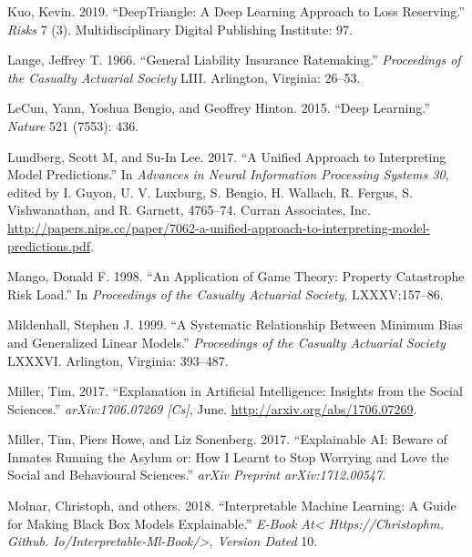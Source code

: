 \documentclass[preprint, 3p, twocolumn, letterpaper, 10pt]{elsarticle} %
\begin{document}
\leavevmode\hypertarget{ref-kuoDeepTriangleDeep2018}{}%
Kuo, Kevin. 2019. ``DeepTriangle: A Deep Learning Approach to Loss Reserving.'' \emph{Risks} 7 (3). Multidisciplinary Digital Publishing Institute: 97.

\leavevmode\hypertarget{ref-lange_1966}{}%
Lange, Jeffrey T. 1966. ``General Liability Insurance Ratemaking.'' \emph{Proceedings of the Casualty Actuarial Society} LIII. Arlington, Virginia: 26--53.

\leavevmode\hypertarget{ref-lecunDeepLearning2015}{}%
LeCun, Yann, Yoshua Bengio, and Geoffrey Hinton. 2015. ``Deep Learning.'' \emph{Nature} 521 (7553): 436.

\leavevmode\hypertarget{ref-NIPS2017_7062}{}%
Lundberg, Scott M, and Su-In Lee. 2017. ``A Unified Approach to Interpreting Model Predictions.'' In \emph{Advances in Neural Information Processing Systems 30}, edited by I. Guyon, U. V. Luxburg, S. Bengio, H. Wallach, R. Fergus, S. Vishwanathan, and R. Garnett, 4765--74. Curran Associates, Inc. \url{http://papers.nips.cc/paper/7062-a-unified-approach-to-interpreting-model-predictions.pdf}.

\leavevmode\hypertarget{ref-mango_1998}{}%
Mango, Donald F. 1998. ``An Application of Game Theory: Property Catastrophe Risk Load.'' In \emph{Proceedings of the Casualty Actuarial Society}, LXXXV:157--86.

\leavevmode\hypertarget{ref-mildenhall_1999}{}%
Mildenhall, Stephen J. 1999. ``A Systematic Relationship Between Minimum Bias and Generalized Linear Models.'' \emph{Proceedings of the Casualty Actuarial Society} LXXXVI. Arlington, Virginia: 393--487.

\leavevmode\hypertarget{ref-millerExplanationArtificial2017}{}%
Miller, Tim. 2017. ``Explanation in Artificial Intelligence: Insights from the Social Sciences.'' \emph{arXiv:1706.07269 {[}Cs{]}}, June. \url{http://arxiv.org/abs/1706.07269}.

\leavevmode\hypertarget{ref-millerExplainableAI2017}{}%
Miller, Tim, Piers Howe, and Liz Sonenberg. 2017. ``Explainable AI: Beware of Inmates Running the Asylum or: How I Learnt to Stop Worrying and Love the Social and Behavioural Sciences.'' \emph{arXiv Preprint arXiv:1712.00547}.

\leavevmode\hypertarget{ref-molnar2018interpretable}{}%
Molnar, Christoph, and others. 2018. ``Interpretable Machine Learning: A Guide for Making Black Box Models Explainable.'' \emph{E-Book At\textless{} Https://Christophm. Github. Io/Interpretable-Ml-Book/\textgreater{}, Version Dated} 10.
\end{document}
